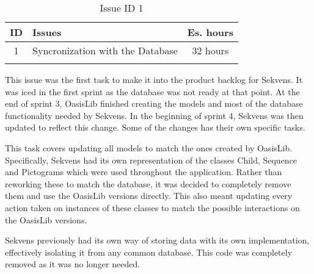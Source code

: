 \begin{longtable} { | c | p{12cm} | c | } 
\hline
	ID 	&	Issues	&		 Es. hours \\\hline
	1	&	Syncronization with the Database	&	32 hours	\\\hline
\caption{Issue ID 1}
\label{tab:spr4_syncwithdatabase}
\end{longtable}

This issue was the first task to make it into the product backlog for Sekvens. It was iced in the first sprint as the database was not ready at that point. At the end of sprint 3, OasisLib finished creating the models and most of the database functionality needed by Sekvens. In the beginning of sprint 4, Sekvens was then updated to reflect this change. Some of the changes has their own specific tasks.

This task covers updating all models to match the ones created by OasisLib. Specifically, Sekvens had its own representation of the classes Child, Sequence and Pictograms which were used throughout the application. Rather than reworking these to match the database, it was decided to completely remove them and use the OasisLib versions directly. This also meant updating every action taken on instances of these classes to match the possible interactions on the OasisLib versions.

Sekvens previously had its own way of storing data with its own implementation, effectively isolating it from any common database. This code was completely removed as it was no longer needed.